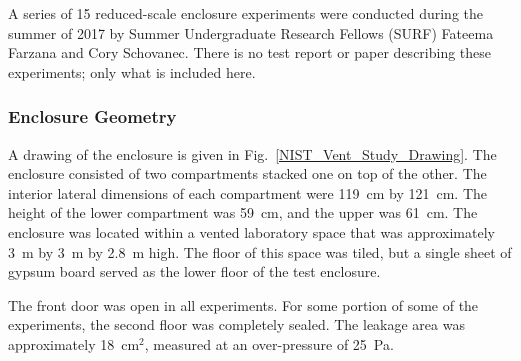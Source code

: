 A series of 15 reduced-scale enclosure experiments were conducted during the summer of 2017 by Summer Undergraduate Research Fellows (SURF) Fateema Farzana and Cory Schovanec. There is no test report or paper describing these experiments; only what is included here.

\subsubsection{Enclosure Geometry}
\label{Enclosure_Geometry}

A drawing of the enclosure is given in Fig.~\ref{NIST_Vent_Study_Drawing}. The enclosure consisted of two compartments stacked one on top of the other. The interior lateral dimensions of each compartment were 119~cm by 121~cm. The height of the lower compartment was 59~cm, and the upper was 61~cm. The enclosure was located within a vented laboratory space that was approximately 3~m by 3~m by 2.8~m high. The floor of this space was tiled, but a single sheet of gypsum board served as the lower floor of the test enclosure.

The front door was open in all experiments. For some portion of some of the experiments, the second floor was completely sealed. The leakage area was approximately 18~cm$^2$, measured at an over-pressure of 25~Pa.

